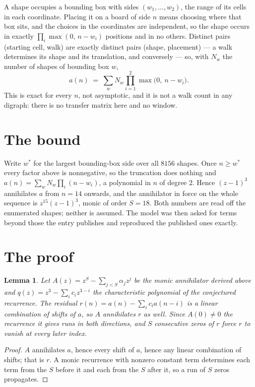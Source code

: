 \documentclass[11pt,a4paper]{article}
\theoremstyle{plain}
\newtheorem{lemma}[theorem]{Lemma}
\theoremstyle{definition}
\begin{document}
A shape occupies a bounding box with sides $(w_1,\dots,w_{2})$, the range of its cells in each
coordinate. Placing it on a board of side $n$ means choosing where that box sits, and the
choices in the coordinates are independent, so the shape occurs in exactly
$\prod_{i}\max(0,\,n-w_i)$ positions and in no others. Distinct pairs (starting cell,
walk) are exactly distinct pairs (shape, placement) --- a walk determines its shape and its
translation, and conversely --- so, with $N_w$ the number of shapes of bounding box $w$,
\[
a(n)\;=\;\sum_{w} N_w \prod_{i=1}^{2}\max\bigl(0,\ n-w_i\bigr).
\]
This is exact for every $n$, not asymptotic, and it is not a walk count in any digraph: there is
no transfer matrix here and no window.

\section{The bound}

Write $w^\ast$ for the largest bounding-box side over all $8156$ shapes. Once $n\ge w^\ast$
every factor above is nonnegative, so the truncation does nothing and
$a(n)=\sum_w N_w\prod_i(n-w_i)$, a polynomial in $n$ of degree $2$. Hence $(z-1)^{3}$
annihilates $a$ from $n=14$ onwards, and the annihilator in force on the whole sequence is
$z^{15}(z-1)^{3}$, monic of order $S=18$. Both numbers are read off the enumerated
shapes; neither is assumed. The model was then asked for terms beyond those the entry publishes
and reproduced the published ones exactly.

\section{The proof}

\begin{lemma}\label{lem:crit}
Let $A(z)=z^S-\sum_{j<S}\alpha_jz^{j}$ be the monic annihilator derived above and
$q(z)=z^{3}-\sum_ic_iz^{3-i}$ the characteristic polynomial of the conjectured
recurrence. The residual $r(n)=a(n)-\sum_ic_ia(n-i)$ is a linear combination of shifts of $a$,
so $A$ annihilates $r$ as well. Since $A(0)\ne0$ the recurrence it gives runs in both
directions, and $S$ consecutive zeros of $r$ force $r$ to vanish at every later index.
\end{lemma}

\begin{proof}
$A$ annihilates $a$, hence every shift of $a$, hence any linear combination of shifts; that is
$r$. A monic recurrence with nonzero constant term determines each term from the $S$ before it
and each from the $S$ after it, so a run of $S$ zeros propagates.
\end{proof}
\end{document}
